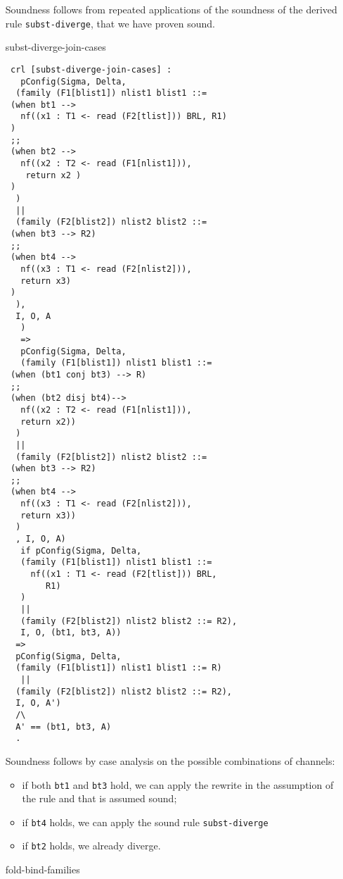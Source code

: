 \documentclass{article}
\begin{document}
\begin{itemize}
Soundness follows
from repeated applications of 
the soundness of the derived rule \texttt{subst-diverge},
that we have proven sound.

\item[subst-diverge-join-cases]

\begin{lstlisting}
 crl [subst-diverge-join-cases] : 
   pConfig(Sigma, Delta, 
  (family (F1[blist1]) nlist1 blist1 ::= 
 (when bt1 --> 
   nf((x1 : T1 <- read (F2[tlist])) BRL, R1)
 )
 ;;
 (when bt2 --> 
   nf((x2 : T2 <- read (F1[nlist1])), 
    return x2 )
 )
  )
  || 
  (family (F2[blist2]) nlist2 blist2 ::= 
 (when bt3 --> R2)
 ;;
 (when bt4 --> 
   nf((x3 : T1 <- read (F2[nlist2])),
   return x3)
 )
  ),
  I, O, A
   )
   => 
   pConfig(Sigma, Delta,
   (family (F1[blist1]) nlist1 blist1 ::= 
 (when (bt1 conj bt3) --> R)
 ;;
 (when (bt2 disj bt4)--> 
   nf((x2 : T2 <- read (F1[nlist1])),
   return x2))
  )
  || 
  (family (F2[blist2]) nlist2 blist2 ::= 
 (when bt3 --> R2)
 ;;
 (when bt4 --> 
   nf((x3 : T1 <- read (F2[nlist2])),
   return x3))
  )
  , I, O, A)  
   if pConfig(Sigma, Delta, 
   (family (F1[blist1]) nlist1 blist1 ::= 
     nf((x1 : T1 <- read (F2[tlist])) BRL, 
        R1)
   )
   ||
   (family (F2[blist2]) nlist2 blist2 ::= R2),
   I, O, (bt1, bt3, A))
  => 
  pConfig(Sigma, Delta, 
  (family (F1[blist1]) nlist1 blist1 ::= R)
   ||
  (family (F2[blist2]) nlist2 blist2 ::= R2), 
  I, O, A') 
  /\
  A' == (bt1, bt3, A)   
  .
\end{lstlisting}

Soundness follows by case analysis on the possible combinations of channels:
\begin{itemize}
\item if both \texttt{bt1} and \texttt{bt3} hold,
we can apply the rewrite in the assumption of the rule and that is assumed 
sound;
\item if \texttt{bt4} holds, we can apply the sound rule \texttt{subst-diverge}
\item if \texttt{bt2} holds, we already diverge.
\end{itemize}

\item[fold-bind-families]


\end{itemize}
\end{document}

